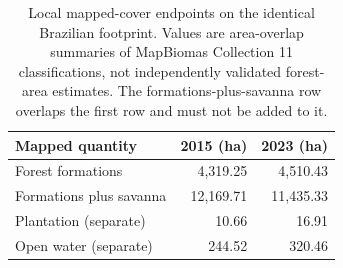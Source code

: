 \begin{table}[htbp]
\centering\small
\caption{Local mapped-cover endpoints on the identical Brazilian footprint. Values are area-overlap summaries of MapBiomas Collection 11 classifications, not independently validated forest-area estimates. The formations-plus-savanna row overlaps the first row and must not be added to it.}\label{tab:brazil_cover}
\begin{tabular}{lrr}
\toprule
Mapped quantity & 2015 (ha) & 2023 (ha)\\\midrule
Forest formations & 4,319.25 & 4,510.43 \\
Formations plus savanna & 12,169.71 & 11,435.33 \\
Plantation (separate) & 10.66 & 16.91 \\
Open water (separate) & 244.52 & 320.46 \\
\bottomrule
\end{tabular}
\end{table}
